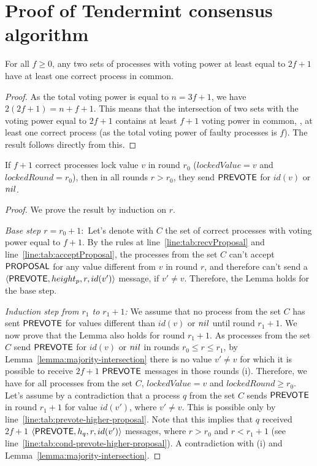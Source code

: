 \section{Proof of Tendermint consensus algorithm} \label{sec:proof}

\begin{lemma} \label{lemma:majority-intersection} For all $f\geq 0$, any two
sets of processes with voting power at least equal to $2f+1$ have at least one
correct process in common.  \end{lemma}

\begin{proof} As the total voting power is equal to $n=3f+1$, we have $2(2f+1)
    = n+f+1$.  This means that the intersection of two sets with the voting
    power equal to $2f+1$ contains at least $f+1$ voting power in common, \ie,
    at least one correct process (as the total voting power of faulty processes
    is $f$). The result follows directly from this.  \end{proof}

\begin{lemma} \label{lemma:locked-decision_value-prevote-v} If $f+1$ correct
processes lock value $v$ in round $r_0$ ($lockedValue = v$ and $lockedRound =
r_0$), then in all rounds $r > r_0$, they send $\mathsf{PREVOTE}$ for $id(v)$ or
$nil$.  \end{lemma}

\begin{proof} We prove the result by induction on $r$.

\emph{Base step $r = r_0 + 1:$} Let's denote with $C$ the set of correct
processes with voting power equal to $f+1$.  By the rules at
line~\ref{line:tab:recvProposal} and line~\ref{line:tab:acceptProposal}, the
processes from the set $C$ can't accept $\mathsf{PROPOSAL}$ for any value different
from $v$ in round $r$, and therefore can't send a $\langle\mathsf{PREVOTE},height_p,
r,id(v')\rangle$ message, if $v' \neq v$. Therefore, the Lemma holds for the base
step.

\emph{Induction step from $r_1$ to $r_1+1$:} We assume that no process from the
set $C$ has sent $\mathsf{PREVOTE}$ for values different than $id(v)$ or $nil$ until
round $r_1 + 1$. We now prove that the Lemma also holds for round $r_1 + 1$. As
processes from the set $C$ send $\mathsf{PREVOTE}$ for $id(v)$ or $nil$ in rounds $r_0
\le r \le r_1$, by Lemma~\ref{lemma:majority-intersection} there is no value
$v' \neq v$ for which it is possible to receive $2f+1$ $\mathsf{PREVOTE}$ messages in
those rounds (i). Therefore, we have for all processes from the set $C$,
$lockedValue = v$ and $lockedRound \ge r_0$.   Let's assume by a contradiction
that a process $q$ from the set $C$ sends $\mathsf{PREVOTE}$ in round $r_1 + 1$ for
value $id(v')$, where $v' \neq v$. This is possible only by
line~\ref{line:tab:prevote-higher-proposal}.  Note that this implies that $q$
received $2f+1$ $\langle\mathsf{PREVOTE},h_q, r,id(v')\rangle$ messages, where $r > r_0$ and $r
< r_1 +1$ (see line~\ref{line:tab:cond-prevote-higher-proposal}). A
contradiction with (i) and Lemma~\ref{lemma:majority-intersection}.
\end{proof}	

